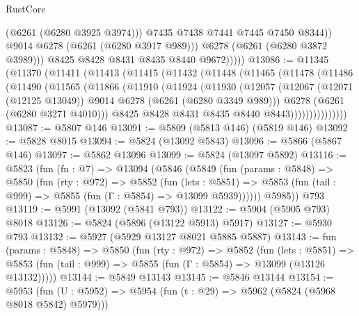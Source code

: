 \begin{lexlean}{RustCore}
\begin{coremodule}
                        (@6261 (@6280 @3925 @3974)))
                      @7435
                      @7438
                      @7441
                      @7445
                      @7450
                      @8344))
                  @9014
                  @6278
                  (@6261 (@6280 @3917 @989)))
                @6278
                (@6261 (@6280 @3872 @3989)))
              @8425
              @8428
              @8431
              @8435
              @8440
              @9672)))))
@13086 := @11345
    (@11370
      (@11411
        (@11413
          (@11415
            (@11432
              (@11448
                (@11465
                  (@11478
                    (@11486
                      (@11490
                        (@11565
                          (@11866
                            (@11910
                              (@11924
                                (@11930
                                  (@12057
                                    (@12067
                                      (@12071 (@12125 @13049))
                                      @9014
                                      @6278
                                      (@6261 (@6280 @3349 @989)))
                                    @6278
                                    (@6261 (@6280 @3271 @4010)))
                                  @8425
                                  @8428
                                  @8431
                                  @8435
                                  @8440
                                  @8443)))))))))))))))
@13087 := @5807 @146
@13091 := @5809 (@5813 @146) (@5819 @146)
@13092 := @5828 @8015
@13094 := @5824 (@13092 @5843)
@13096 := @5866 (@5867 @146)
@13097 := @5862 @13096
@13099 := @5824 (@13097 @5892)
@13116 := @5823
    (fun (fn : @7) =>
    @13094
      (@5846
        (@5849
          (fun (params : @5848) =>
          @5850
            (fun (rty : @972) =>
            @5852
              (fun (lets : @5851) =>
              @5853 (fun (tail : @999) => @5855 (fun (Γ : @5854) => @13099 @5939))))))
        @5985))
    @793
@13119 := @5991 (@13092 (@5841 @793))
@13122 := @5904 (@5905 @793) @8018
@13126 := @5824 (@5896 (@13122 @5913) @5917)
@13127 := @5930 @793
@13132 := @5927 (@5929 @13127 @8021 @5885 @5887)
@13143 := fun (params : @5848) =>
  @5850
    (fun (rty : @972) =>
    @5852
      (fun (lets : @5851) =>
      @5853 (fun (tail : @999) => @5855 (fun (Γ : @5854) => @13099 (@13126 @13132)))))
@13144 := @5849 @13143
@13145 := @5846 @13144
@13154 := @5953
    (fun (U : @5952) => @5954 (fun (t : @29) => @5962 (@5824 (@5968 @8018 @5842) @5979)))

\end{coremodule}
\end{lexlean}
